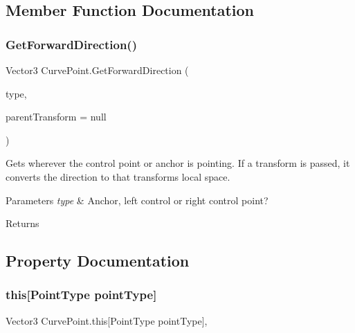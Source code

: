 \subsection{Member Function Documentation}
\mbox{\label{class_curve_point_a1d347d73350bdc47a71c17f030507d7f}} 
\subsubsection{\texorpdfstring{Get\+Forward\+Direction()}{GetForwardDirection()}}
{\footnotesize\ttfamily Vector3 Curve\+Point.\+Get\+Forward\+Direction (\begin{DoxyParamCaption}\item[{Point\+Type}]{type,  }\item[{Transform}]{parent\+Transform = {\ttfamily null} }\end{DoxyParamCaption})}



Gets wherever the control point or anchor is pointing. If a transform is passed, it converts the direction to that transform\textquotesingle{}s local space. 


\begin{DoxyParams}{Parameters}
{\em type} & Anchor, left control or right control point? \\
\hline
\end{DoxyParams}
\begin{DoxyReturn}{Returns}

\end{DoxyReturn}


\subsection{Property Documentation}
\mbox{\label{class_curve_point_a4770bc5efb8c44892b8216d3a12b645a}} 
\subsubsection{\texorpdfstring{this[Point\+Type point\+Type]}{this[PointType pointType]}}
{\footnotesize\ttfamily Vector3 Curve\+Point.\+this\mbox{[}Point\+Type point\+Type\mbox{]}\hspace{0.3cm}{\ttfamily [get]}, {\ttfamily [set]}}



